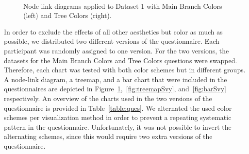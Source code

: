 \documentclass[journal]{vgtc}                %
\begin{document}
\begin{figure}[tb]
  \centering
  \mbox{
  }
  \caption{Node link diagrams applied to Dataset 1 with Main Branch Colors (left) and Tree Colors (right).}\label{fig:graphSvy}
\end{figure}

In order to exclude the effects of all other aesthetics but color as much as possible, we distributed two different versions of the questionnaire. Each participant was randomly assigned to one version. For the two versions, the datasets for the Main Branch Colors and Tree Colors questions were swapped. Therefore, each chart was tested with both color schemes but in different groups. A node-link diagram, a treemap, and a bar chart that were included in the questionnaires are depicted in Figure~\ref{fig:graphSvy},~\ref{fig:treemapSvy}, and~\ref{fig:barSvy} respectively. An overview of the charts used in the two versions of the questionnaire is provided in Table~\ref{table:ques}. We alternated the used color schemes per visualization method in order to prevent a repeating systematic pattern in the questionnaire. Unfortunately, it was not possible to invert the alternating schemes, since this would require two extra versions of the questionnaire.
\end{document}
